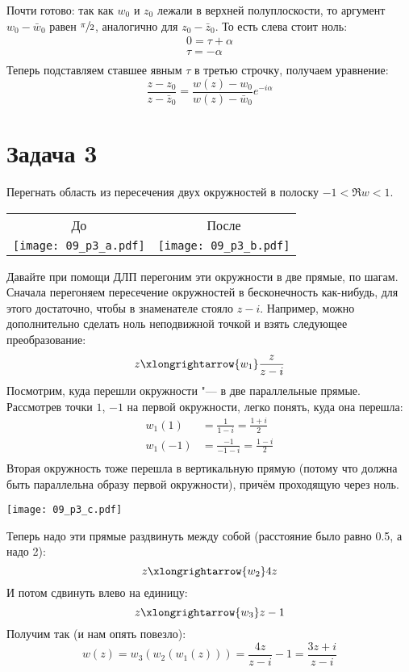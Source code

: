 	Почти готово: так как $w_0$ и $z_0$ лежали в верхней полуплоскости, то аргумент $w_0 - \bar w_0$ равен $\sfrac{\pi}2$, аналогично для $z_0-\bar z_0$.
	То есть слева стоит ноль:
	\begin{gather*}
		0 = \tau + \alpha \\
		\tau = -\alpha \\
	\end{gather*}
	Теперь подставляем ставшее явным $\tau$ в третью строчку, получаем уравнение:
	\[
		\frac{z-z_0}{z-\bar z_0} = \frac{w(z)-w_0}{w(z)-\bar w_0} e^{-i\alpha}
	\]

\section{Задача 3}
	Перегнать область из пересечения двух окружностей в полоску $-1 < \Re w < 1$.
	\begin{center}
		\begin{tabular}{cc}
		До & После \\
		\texttt{[image: 09\_p3\_a.pdf]} & \texttt{[image: 09\_p3\_b.pdf]} \\
		\end{tabular}
	\end{center}

	Давайте при помощи ДЛП перегоним эти окружности в две прямые, по шагам.
	Сначала перегоняем пересечение окружностей в бесконечность как-нибудь, для этого достаточно, чтобы в знаменателе стояло $z-i$.
	Например, можно дополнительно сделать ноль неподвижной точкой и взять следующее преобразование:
	\[ z \xlongrightarrow{w_1} \frac{z}{z-i} \]
	Посмотрим, куда перешли окружности "--- в две параллельные прямые.
	Рассмотрев точки $1$, $-1$ на первой окружности, легко понять, куда она перешла:
	\begin{align*}
		w_1(1) &= \frac{1}{1-i} = \frac{1+i}{2} \\
		w_1(-1) &= \frac{-1}{-1-i} = \frac{1-i}{2} \\
	\end{align*}
	Вторая окружность тоже перешла в вертикальную прямую (потому что должна быть параллельна образу первой окружности), причём проходящую через ноль.
	\begin{center}
		\texttt{[image: 09\_p3\_c.pdf]}
	\end{center}

	Теперь надо эти прямые раздвинуть между собой (расстояние было равно 0.5, а надо 2):
	\[ z \xlongrightarrow{w_2} 4z \]
	И потом сдвинуть влево на единицу:
	\[ z \xlongrightarrow{w_3} z - 1 \]
	Получим так (и нам опять повезло):
	\[
		w(z) = w_3(w_2(w_1(z))) = \frac{4z}{z-i} - 1 = \frac{3z+i}{z-i}
	\]

